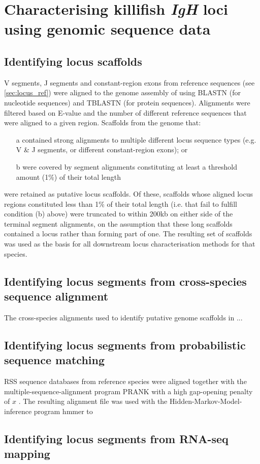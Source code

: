 

\section{Characterising killifish \textit{IgH} loci using genomic sequence data}

\subsection{Identifying locus scaffolds}

V segments, J segments and constant-region exons from reference sequences (see \autoref{sec:locus_ref}) were aligned to the genome assembly of %
using BLASTN (for nucleotide sequences) and TBLASTN (for protein sequences). Alignments were filtered based on E-value and the number of different reference sequences that were aligned to a given region. Scaffolds from the genome that:

\begin{enumerate}
\item[a] contained strong alignments to multiple different locus sequence types (e.g. V & J segments, or different constant-region exons); or
\item[b] were covered by segment alignments constituting at least a threshold amount (1\%) of their total length
\end{enumerate}

were retained as putative locus scaffolds. Of these, scaffolds whose aligned locus regions constituted less than 1\% of their total length (i.e. that fail to fulfill condition (b) above) were truncated to within 200kb on either side of the terminal segment alignments, on the assumption that these long scaffolds contained a locus rather than forming part of one. The resulting set of scaffolds was used as the basis for all downstream locus characterisation methods for that species.

\subsection{Identifying locus segments from cross-species sequence alignment}

The cross-species alignments used to identify putative genome scaffolds in ...

\subsection{Identifying locus segments from probabilistic sequence matching}

RSS sequence databases from reference species were aligned together with the multiple-sequence-alignment program PRANK %
with a high gap-opening penalty of $x$ %
. %
The resulting alignment file was used with the Hidden-Markov-Model-inference program hmmer to 

\subsection{Identifying locus segments from RNA-seq mapping}


